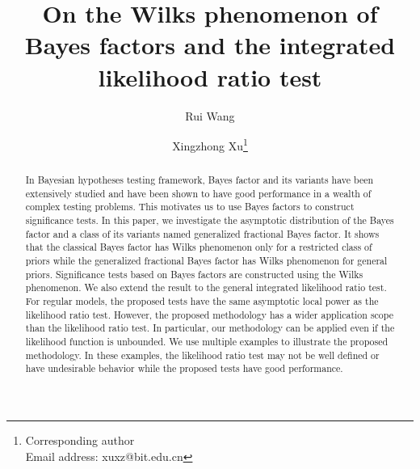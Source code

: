 \documentclass[11pt]{article}
\theoremstyle{plain}
\theoremstyle{definition}
\theoremstyle{remark}
\begin{document}
\title{On the Wilks phenomenon of Bayes factors and the integrated likelihood ratio test}
\author[1,2]{Rui Wang}
\author[2,3]{Xingzhong Xu\thanks{Corresponding author\\Email address: xuxz@bit.edu.cn}}

\maketitle


\begin{abstract}
In Bayesian hypotheses testing framework, Bayes factor and its variants have been extensively studied and have been shown to have good performance in a wealth of complex testing problems.
This motivates us to use Bayes factors to construct significance tests.
In this paper, we investigate the asymptotic distribution of the Bayes factor and a class of its variants named generalized fractional Bayes factor.
It shows that the classical Bayes factor has Wilks phenomenon only for a restricted class of priors while the generalized fractional Bayes factor has Wilks phenomenon for general priors.
Significance tests based on Bayes factors are constructed using the Wilks phenomenon.
We also extend the result to the general integrated likelihood ratio test.
For regular models, the proposed tests have the same asymptotic local power as the likelihood ratio test.
However, %
the proposed methodology has a wider application scope than the likelihood ratio test.
In particular, our methodology can be applied even if the likelihood function is unbounded.
We use multiple examples to illustrate the proposed methodology.
In these examples, the likelihood ratio test may not be well defined or have undesirable behavior while the proposed tests have good performance.
\end{abstract}
\end{document}

